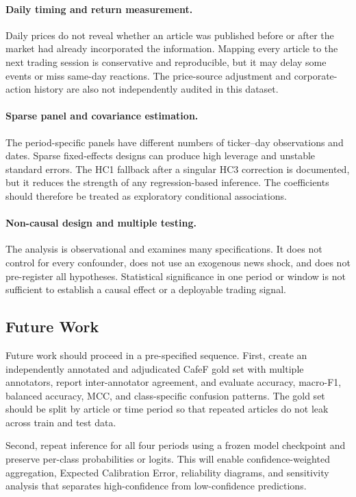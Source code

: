 \paragraph{Daily timing and return measurement.}
Daily prices do not reveal whether an article was published before or after the market had already incorporated the information. Mapping every article to the next trading session is conservative and reproducible, but it may delay some events or miss same-day reactions. The price-source adjustment and corporate-action history are also not independently audited in this dataset.

\paragraph{Sparse panel and covariance estimation.}
The period-specific panels have different numbers of ticker--day observations and dates. Sparse fixed-effects designs can produce high leverage and unstable standard errors. The HC1 fallback after a singular HC3 correction is documented, but it reduces the strength of any regression-based inference. The coefficients should therefore be treated as exploratory conditional associations.

\paragraph{Non-causal design and multiple testing.}
The analysis is observational and examines many specifications. It does not control for every confounder, does not use an exogenous news shock, and does not pre-register all hypotheses. Statistical significance in one period or window is not sufficient to establish a causal effect or a deployable trading signal.

\subsection{Future Work}
\label{subsec:future-work-statistical}

Future work should proceed in a pre-specified sequence. First, create an independently annotated and adjudicated CafeF gold set with multiple annotators, report inter-annotator agreement, and evaluate accuracy, macro-F1, balanced accuracy, MCC, and class-specific confusion patterns. The gold set should be split by article or time period so that repeated articles do not leak across train and test data.

Second, repeat inference for all four periods using a frozen model checkpoint and preserve per-class probabilities or logits. This will enable confidence-weighted aggregation, Expected Calibration Error, reliability diagrams, and sensitivity analysis that separates high-confidence from low-confidence predictions.

